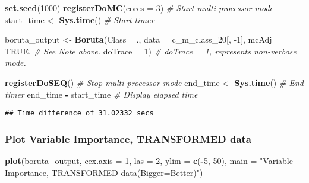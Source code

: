 \documentclass[]{article}
\newenvironment{Shaded}{\begin{snugshade}}{\end{snugshade}}
\newcommand{\CommentTok}[1]{\textcolor[rgb]{0.56,0.35,0.01}{\textit{#1}}}
\newcommand{\DataTypeTok}[1]{\textcolor[rgb]{0.13,0.29,0.53}{#1}}
\newcommand{\DecValTok}[1]{\textcolor[rgb]{0.00,0.00,0.81}{#1}}
\newcommand{\KeywordTok}[1]{\textcolor[rgb]{0.13,0.29,0.53}{\textbf{#1}}}
\newcommand{\NormalTok}[1]{#1}
\newcommand{\OperatorTok}[1]{\textcolor[rgb]{0.81,0.36,0.00}{\textbf{#1}}}
\newcommand{\OtherTok}[1]{\textcolor[rgb]{0.56,0.35,0.01}{#1}}
\newcommand{\StringTok}[1]{\textcolor[rgb]{0.31,0.60,0.02}{#1}}
\begin{document}
\begin{Shaded}
\begin{Highlighting}[]
\KeywordTok{set.seed}\NormalTok{(}\DecValTok{1000}\NormalTok{)}
\KeywordTok{registerDoMC}\NormalTok{(}\DataTypeTok{cores =} \DecValTok{3}\NormalTok{) }\CommentTok{# Start multi-processor mode}
\NormalTok{start_time <-}\StringTok{ }\KeywordTok{Sys.time}\NormalTok{() }\CommentTok{# Start timer}

\NormalTok{boruta_output <-}\StringTok{ }\KeywordTok{Boruta}\NormalTok{(Class }\OperatorTok{~}\StringTok{ }\NormalTok{.,}
                        \DataTypeTok{data =}\NormalTok{ c_m_class_}\DecValTok{20}\NormalTok{[, }\DecValTok{-1}\NormalTok{],}
                        \DataTypeTok{mcAdj =} \OtherTok{TRUE}\NormalTok{, }\CommentTok{# See Note above.}
                        \DataTypeTok{doTrace =} \DecValTok{1}\NormalTok{) }\CommentTok{# doTrace = 1, represents non-verbose mode.}

\KeywordTok{registerDoSEQ}\NormalTok{() }\CommentTok{# Stop multi-processor mode}
\NormalTok{end_time <-}\StringTok{ }\KeywordTok{Sys.time}\NormalTok{() }\CommentTok{# End timer}
\NormalTok{end_time }\OperatorTok{-}\StringTok{ }\NormalTok{start_time }\CommentTok{# Display elapsed time}
\end{Highlighting}
\end{Shaded}

\begin{verbatim}
## Time difference of 31.02332 secs
\end{verbatim}

\hypertarget{plot-variable-importance-transformed-data}{%
\subsubsection{Plot Variable Importance, TRANSFORMED
data}\label{plot-variable-importance-transformed-data}}

\begin{Shaded}
\begin{Highlighting}[]
\KeywordTok{plot}\NormalTok{(boruta_output,}
     \DataTypeTok{cex.axis =} \DecValTok{1}\NormalTok{,}
     \DataTypeTok{las =} \DecValTok{2}\NormalTok{,}
     \DataTypeTok{ylim =} \KeywordTok{c}\NormalTok{(}\OperatorTok{-}\DecValTok{5}\NormalTok{, }\DecValTok{50}\NormalTok{),}
     \DataTypeTok{main =} \StringTok{"Variable Importance, TRANSFORMED data(Bigger=Better)"}\NormalTok{)}
\end{Highlighting}
\end{Shaded}
\end{document}
